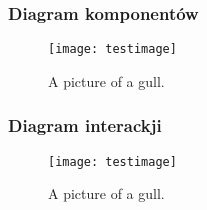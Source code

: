 \subsubsection{Diagram komponentów}

\begin{figure}[h!]
  \caption{A picture of a gull.}
  \centering
    \texttt{[image: testimage]}
\end{figure}

\subsubsection{Diagram interackji}

\begin{figure}[h!]
  \caption{A picture of a gull.}
  \centering
    \texttt{[image: testimage]}
\end{figure}
